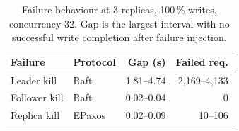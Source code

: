\begin{table}[t]
\caption{Failure behaviour at 3 replicas, 100\,\% writes, concurrency 32.
Gap is the largest interval with no successful write completion after
failure injection.}
\label{tab:failure}
\begin{tabular}{llrr}
\toprule
Failure & Protocol & Gap (s) & Failed req. \\
\midrule
Leader kill & Raft & 1.81--4.74 & 2{,}169--4{,}133 \\
Follower kill & Raft & 0.02--0.04 & 0 \\
Replica kill & EPaxos & 0.02--0.09 & 10--106 \\
\bottomrule
\end{tabular}
\end{table}
